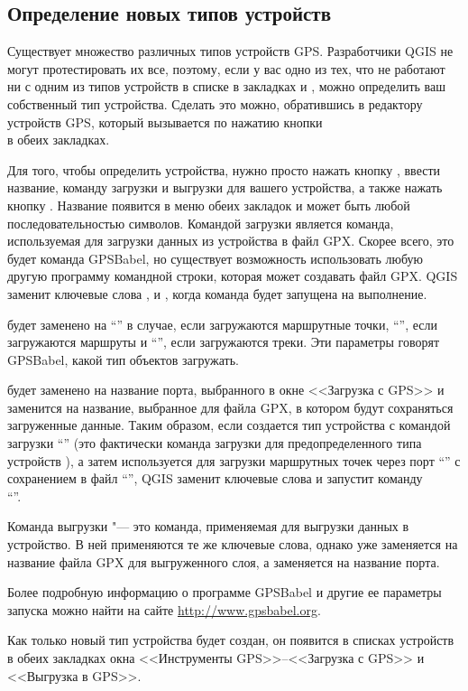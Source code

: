 \subsection{Определение новых типов устройств}\label{sec:Defining-new-device}

Существует множество различных типов устройств GPS. Разработчики QGIS не
могут протестировать их все, поэтому, если у вас одно из тех, что не
работают ни с одним из типов устройств в списке в закладках
 и , можно определить ваш
собственный тип устройства. Сделать это можно, обратившись в редактору
устройств GPS, который вызывается по нажатию кнопки \\
 в обеих закладках.

Для того, чтобы определить устройства, нужно просто нажать кнопку
, ввести название, команду загрузки и выгрузки для
вашего устройства, а также нажать кнопку . Название
появится в меню обеих закладок и может быть любой последовательностью
символов. Командой загрузки является команда, используемая для загрузки
данных из устройства в файл GPX. Скорее всего, это будет команда
GPSBabel, но существует возможность использовать любую другую программу
командной строки, которая может создавать файл GPX. QGIS заменит
ключевые слова ,  и
, когда команда будет запущена на выполнение.

 будет заменено на {}``'' в случае,
если загружаются маршрутные точки, {}``'', если
загружаются маршруты и {}``'', если загружаются треки.
Эти параметры говорят GPSBabel, какой тип объектов загружать.

 будет заменено на название порта, выбранного в окне
<<Загрузка с GPS>> и  заменится на название, выбранное
для файла GPX, в котором будут сохраняться загруженные данные. Таким
образом, если создается тип устройства с командой загрузки
{}``'' (это
фактически команда загрузки для предопределенного типа устройств
), а затем используется
для загрузки маршрутных точек через порт {}``'' с
сохранением в файл {}``'', QGIS заменит ключевые
слова и запустит команду \\
{}``''.

Команда выгрузки "--- это команда, применяемая для выгрузки данных в
устройство. В ней применяются те же ключевые слова, однако
 уже заменяется на название файла GPX для выгруженного
слоя, а  заменяется на название порта.

Более подробную информацию о программе GPSBabel и другие ее параметры
запуска можно найти на сайте \url{http://www.gpsbabel.org}.

Как только новый тип устройства будет создан, он появится в списках
устройств в обеих закладках окна <<Инструменты GPS>>--<<Загрузка с GPS>>
и <<Выгрузка в GPS>>.

\FloatBarrier
